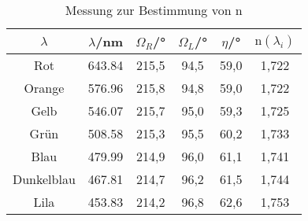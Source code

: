 \begin{table}[h!]
  \centering
  \caption{Messung zur Bestimmung von n}
  \label{tab:nu}
  \begin{tabular}{c c c c c c}
    \toprule
      $\lambda$ & $\lambda$/nm & $\Omega_R$/° & $\Omega_L$/°  & $\eta$/° & $\text{n}(\lambda_i)$\\
    \midrule





Rot	        & 643.84 &215,5	&94,5	&59,0 & 1,722\\
Orange	    & 576.96 &215,8	&94,8	&59,0 & 1,722\\
Gelb	      & 546.07 &215,7	&95,0	&59,3 & 1,725\\
Grün	      & 508.58 &215,3	&95,5	&60,2 & 1,733\\
Blau	      & 479.99 &214,9	&96,0	&61,1 & 1,741\\
Dunkelblau	& 467.81 &214,7	&96,2	&61,5 & 1,744\\
Lila	      & 453.83 &214,2	&96,8	&62,6 & 1,753\\












    \bottomrule
  \end{tabular}
\end{table}
